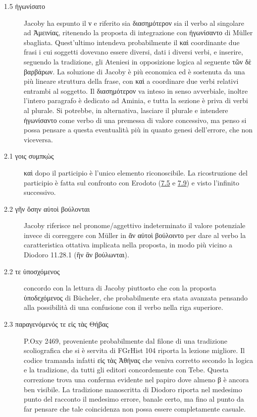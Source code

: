 \begin{description}
\item[1.5 \textgreek{ἠγωνίσατο}] Jacoby ha espunto il \textgreek{ν} e riferito sia \textgreek{διασημότερον} sia il verbo al singolare ad \textgreek{Ἀμεινίας}, ritenendo la proposta di integrazione con \textgreek{ἠγωνίσαντο } di Müller sbagliata. Quest'ultimo intendeva probabilmente il \textgreek{καὶ} coordinante due frasi i cui soggetti dovevano essere diversi, dati i diversi verbi, e inserire, seguendo la tradizione, gli Ateniesi in opposizione logica al seguente \textgreek{τῶν δὲ βαρβάρων}. La soluzione di Jacoby è più economica ed è sostenuta da una più lineare struttura della frase, con \textgreek{καὶ} a coordinare due verbi relativi entrambi al soggetto. Il  \textgreek{διασημότερον} va inteso in senso avverbiale, inoltre l'intero paragrafo è dedicato ad Aminia, e tutta la sezione è priva di verbi al plurale. Si potrebbe, in alternativa, lasciare il plurale e intendere \textgreek{ἠγωνίσαντο} come verbo di una premessa di valore concessivo, ma penso si possa pensare a questa eventualità più in quanto genesi dell'errore, che non viceversa. 
\item[2.1 \textgreek{γοις συμπ\d{κὼς}}] \textgreek{καὶ} dopo il participio è l'unico elemento riconoscibile. La ricostruzione del participio è fatta sul confronto con Erodoto (\href{http://data.perseus.org/citations/urn:cts:greekLit:tlg0016.tlg001.perseus-grc1:7.5}{7.5} e \href{http://data.perseus.org/citations/urn:cts:greekLit:tlg0016.tlg001.perseus-grc1:7.9}{7.9}) e visto l'infinito successivo.
\item[2.2 \textgreek{γῆν ὅσην αὐτοὶ βούλονται}] Jacoby riferisce nel pronome/aggettivo indeterminato il valore potenziale invece di correggere con Müller in \textgreek{ἄν αὐτοὶ βούλοιντο} per dare al verbo la caratteristica ottativa implicata nella proposta, in modo più vicino a Diodoro 11.28.1 (\textgreek{ἣν ἃν βούλωνται}).
\item[2.2 \textgreek{τε ὑποσχόμενος}] concordo con la lettura di Jacoby piuttosto che con la proposta \textgreek{ὑποδεχόμενος} di Bücheler, che probabilmente era stata avanzata pensando alla possibilità di una confusione con il verbo nella riga superiore.
\item[2.3 \textgreek{παραγενόμενός τε εἰς τὰς Θήβας}] P.Oxy 2469, proveniente probabilmente dal filone di una tradizione scoliografica che si è servita di FGrHist 104 riporta la lezione migliore. Il codice tramanda infatti \textgreek{εἰς τὰς Ἀθήνας} che veniva corretto secondo la logica e la tradizione, da tutti gli editori concordemente con Tebe. Questa correzione trova una conferma evidente nel papiro dove almeno \textgreek{β} è ancora ben visibile. La tradizione manoscritta di Diodoro riporta nel medesimo punto del racconto il medesimo errore, banale certo, ma fino al punto da far pensare che tale coincidenza non possa essere completamente casuale.

\end{description}
